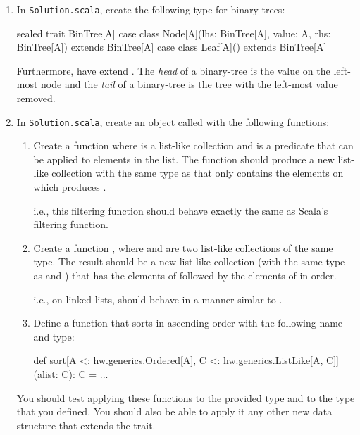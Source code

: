 \documentclass{book}
\begin{document}
\begin{enumerate}

  \item In \texttt{Solution.scala}, create the following type for
  binary trees:
  \begin{scalacode}
  sealed trait BinTree[A]
  case class Node[A](lhs: BinTree[A], value: A, rhs: BinTree[A]) extends BinTree[A]
  case class Leaf[A]() extends BinTree[A]
  \end{scalacode}

  Furthermore, have  extend .
  The \emph{head} of a binary-tree is the value on the left-most node
  and the \emph{tail} of a binary-tree is the tree with the left-most
  value removed.

  \item In \texttt{Solution.scala}, create an object called  with the following functions:

    \begin{enumerate}

      \item Create a function 
      where  is a list-like collection and
       is a predicate that can be applied to elements in
      the list. The function should produce a new list-like collection
      with the same type as  that only contains the
      elements on which  produces .

      i.e., this filtering function should behave exactly the same
      as Scala's filtering function.

      \item Create a function , where
       and  are two list-like
      collections of the same type. The result should be a new list-like
      collection (with the same type as  and
      ) that has the elements of 
      followed by the elements of  in order.

      i.e., on linked lists,  should
      behave in a manner simlar to . 
      \item Define a function that sorts in ascending order with the
      following name and type:

      \begin{scalacode}
      def sort[A <: hw.generics.Ordered[A], C <: hw.generics.ListLike[A, C]](alist: C): C = {
        ...
      }
      \end{scalacode}

    \end{enumerate}

    You should test applying these functions to the provided
     type and to the  type that
    you defined. You should also be able to apply it any other new data
    structure that extends the  trait. 
\end{enumerate}
\end{document}
